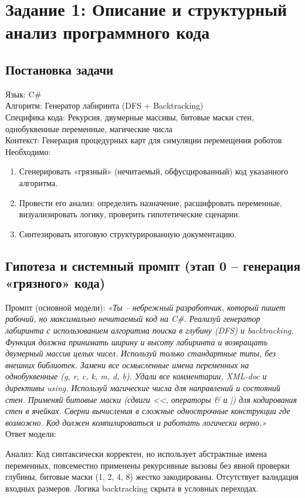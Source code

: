 \section*{Задание 1: Описание и структурный анализ программного кода}
\subsection{Постановка задачи}
\noindent
Язык: C\# \\
Алгоритм: Генератор лабиринта (DFS + Backtracking) \\
Специфика кода: Рекурсия, двумерные массивы, битовые маски стен, однобуквенные переменные, магические числа \\
Контекст: Генерация процедурных карт для симуляции перемещения роботов\\
\vspace{0.5em}
Необходимо:
\begin{enumerate}
\item Сгенерировать «грязный» (нечитаемый, обфусцированный) код указанного алгоритма.
\item Провести его анализ: определить назначение, расшифровать переменные, визуализировать логику, проверить гипотетические сценарии.
\item Синтезировать итоговую структурированную документацию.
\end{enumerate}

\subsection{Гипотеза и системный промпт (этап 0 – генерация «грязного» кода)}
Промпт (основной модели):
\textit{«Ты – небрежный разработчик, который пишет рабочий, но максимально нечитаемый код на C\#. Реализуй генератор лабиринта с использованием алгоритма поиска в глубину (DFS) и backtracking. Функция должна принимать ширину и высоту лабиринта и возвращать двумерный массив целых чисел. Используй только стандартные типы, без внешних библиотек. Замени все осмысленные имена переменных на однобуквенные (g, r, c, k, m, d, b). Удали все комментарии, XML-doc и директивы using. Используй магические числа для направлений и состояний стен. Применяй битовые маски (сдвиги <<, операторы \& и |) для кодирования стен в ячейках. Сверни вычисления в сложные однострочные конструкции где возможно. Код должен компилироваться и работать логически верно.»}\\
\vspace{0.5em}
Ответ модели:
\newpage

\noindent
\indent Анализ: Код синтаксически корректен, но использует абстрактные имена переменных, повсеместно применены рекурсивные вызовы без явной проверки глубины, битовые маски (1, 2, 4, 8) жестко закодированы. Отсутствует валидация входных размеров. Логика backtracking скрыта в условных переходах.

